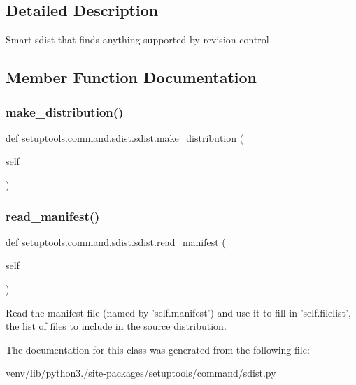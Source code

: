 \subsection{Detailed Description}
\begin{DoxyVerb}Smart sdist that finds anything supported by revision control\end{DoxyVerb}
 

\subsection{Member Function Documentation}
\mbox{\label{classsetuptools_1_1command_1_1sdist_1_1sdist_ae6d47a19d2e20da1f420b9ce2daeec72}} 
\subsubsection{\texorpdfstring{make\+\_\+distribution()}{make\_distribution()}}
{\footnotesize\ttfamily def setuptools.\+command.\+sdist.\+sdist.\+make\+\_\+distribution (\begin{DoxyParamCaption}\item[{}]{self }\end{DoxyParamCaption})}

 \mbox{\label{classsetuptools_1_1command_1_1sdist_1_1sdist_a1b7a74f9d8dda385451371dea8b113d1}} 
\subsubsection{\texorpdfstring{read\+\_\+manifest()}{read\_manifest()}}
{\footnotesize\ttfamily def setuptools.\+command.\+sdist.\+sdist.\+read\+\_\+manifest (\begin{DoxyParamCaption}\item[{}]{self }\end{DoxyParamCaption})}

\begin{DoxyVerb}Read the manifest file (named by 'self.manifest') and use it to
fill in 'self.filelist', the list of files to include in the source
distribution.
\end{DoxyVerb}
 

The documentation for this class was generated from the following file\+:\begin{DoxyCompactItemize}
\item 
venv/lib/python3./site-\/packages/setuptools/command/sdist.\+py\end{DoxyCompactItemize}
